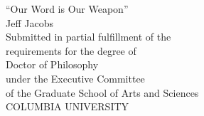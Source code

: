 
\begin{titlepage}
	\begin{center}
		
		\begin{singlespacing}
			\vspace*{6\baselineskip}
			``Our Word is Our Weapon''\\
			\vspace{3\baselineskip}
			Jeff Jacobs\\
			\vspace{18\baselineskip}
			Submitted in partial fulfillment of the\\
			requirements for the degree of\\
			Doctor of Philosophy\\
			under the Executive Committee\\
			of the Graduate School of Arts and Sciences\\
			\vspace{3\baselineskip}
			COLUMBIA UNIVERSITY\\
			\vspace{3\baselineskip}
			\the\year
			\vfill
			
			
		\end{singlespacing}
		
	\end{center}
\end{titlepage}


